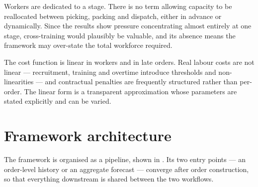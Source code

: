 Workers are dedicated to a stage. There is no term allowing capacity to be reallocated between
picking, packing and dispatch, either in advance or dynamically. Since the results show pressure
concentrating almost entirely at one stage, cross-training would plausibly be valuable, and its
absence means the framework may over-state the total workforce required.

The cost function is linear in workers and in late orders. Real labour costs are not linear ---
recruitment, training and overtime introduce thresholds and non-linearities --- and contractual
penalties are frequently structured rather than per-order. The linear form is a transparent
approximation whose parameters are stated explicitly and can be varied.

\section{Framework architecture}
\label{sec:architecture}

The framework is organised as a pipeline, shown in . Its two entry
points --- an order-level history or an aggregate forecast --- converge after order
construction, so that everything downstream is shared between the two workflows.


